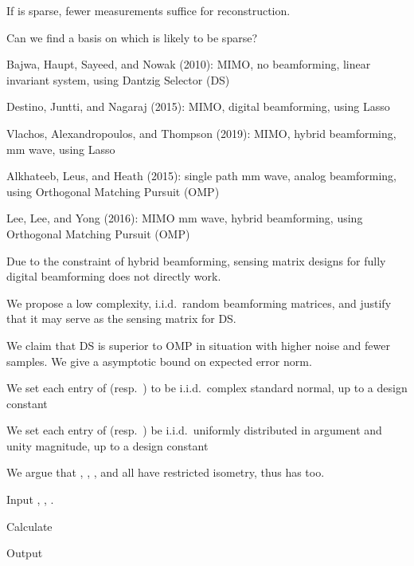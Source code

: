 {
\blank [big]

\I If  is sparse, fewer measurements suffice for reconstruction.

\I Can we find a basis on which  is likely to be sparse?
}
{
\I Bajwa, Haupt, Sayeed, and Nowak (2010): MIMO, no beamforming, linear invariant system, using Dantzig Selector (DS)

\I Destino, Juntti, and Nagaraj (2015): MIMO, digital beamforming, using Lasso

\I Vlachos, Alexandropoulos, and Thompson (2019): MIMO, hybrid beamforming, mm wave, using Lasso

\I Alkhateeb, Leus, and Heath (2015): single path mm wave, analog beamforming, using Orthogonal Matching Pursuit (OMP)

\I Lee, Lee, and Yong (2016): MIMO mm wave, hybrid beamforming, using Orthogonal Matching Pursuit (OMP)
}
{
\I Due to the constraint of hybrid beamforming, sensing matrix designs for fully digital beamforming does not directly work.

\I We propose a low complexity, i.i.d.\ random beamforming matrices, and justify that it may serve as the sensing matrix for DS.

\I We claim that DS is superior to OMP in situation with higher noise and fewer samples.
\I We give a asymptotic bound on expected error norm.
}
{
\I We set each entry of  (resp.\ ) to be i.i.d.\ complex standard normal, up to a design constant

\I We set each entry of  (resp.\ ) be i.i.d.\ uniformly distributed in argument and unity magnitude, up to a design constant

\I We argue that , , , and  all have restricted isometry, thus  has too.
}
{
\I Input , , .

\I Calculate

\I Output 
}


